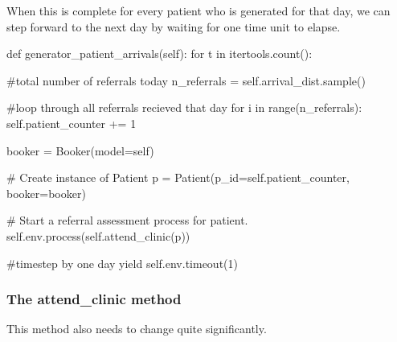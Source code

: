 \documentclass[
  letterpaper,
  DIV=11,
  numbers=noendperiod]{scrreprt}
\newenvironment{Shaded}{}{}
\newcommand{\BuiltInTok}[1]{\textcolor[rgb]{0.84,0.23,0.29}{#1}}
\newcommand{\CommentTok}[1]{\textcolor[rgb]{0.42,0.45,0.49}{#1}}
\newcommand{\ControlFlowTok}[1]{\textcolor[rgb]{0.84,0.23,0.29}{#1}}
\newcommand{\DecValTok}[1]{\textcolor[rgb]{0.00,0.36,0.77}{#1}}
\newcommand{\KeywordTok}[1]{\textcolor[rgb]{0.84,0.23,0.29}{#1}}
\newcommand{\NormalTok}[1]{\textcolor[rgb]{0.14,0.16,0.18}{#1}}
\newcommand{\OperatorTok}[1]{\textcolor[rgb]{0.14,0.16,0.18}{#1}}
\newcommand{\VariableTok}[1]{\textcolor[rgb]{0.89,0.38,0.04}{#1}}
\begin{document}
When this is complete for every patient who is generated for that day,
we can step forward to the next day by waiting for one time unit to
elapse.

\begin{Shaded}
\begin{Highlighting}[]
\KeywordTok{def}\NormalTok{ generator\_patient\_arrivals(}\VariableTok{self}\NormalTok{):}
    \ControlFlowTok{for}\NormalTok{ t }\KeywordTok{in}\NormalTok{ itertools.count():}

        \CommentTok{\#total number of referrals today}
\NormalTok{        n\_referrals }\OperatorTok{=} \VariableTok{self}\NormalTok{.arrival\_dist.sample()}

        \CommentTok{\#loop through all referrals recieved that day}
        \ControlFlowTok{for}\NormalTok{ i }\KeywordTok{in} \BuiltInTok{range}\NormalTok{(n\_referrals):}
            \VariableTok{self}\NormalTok{.patient\_counter }\OperatorTok{+=} \DecValTok{1}

\NormalTok{            booker }\OperatorTok{=}\NormalTok{ Booker(model}\OperatorTok{=}\VariableTok{self}\NormalTok{)}

            \CommentTok{\# Create instance of Patient}
\NormalTok{            p }\OperatorTok{=}\NormalTok{ Patient(p\_id}\OperatorTok{=}\VariableTok{self}\NormalTok{.patient\_counter, booker}\OperatorTok{=}\NormalTok{booker)}

            \CommentTok{\# Start a referral assessment process for patient.}
            \VariableTok{self}\NormalTok{.env.process(}\VariableTok{self}\NormalTok{.attend\_clinic(p))}

        \CommentTok{\#timestep by one day}
        \ControlFlowTok{yield} \VariableTok{self}\NormalTok{.env.timeout(}\DecValTok{1}\NormalTok{)}
\end{Highlighting}
\end{Shaded}

\subsubsection{The attend\_clinic
method}\label{the-attend_clinic-method-7}

This method also needs to change quite significantly.
\end{document}
